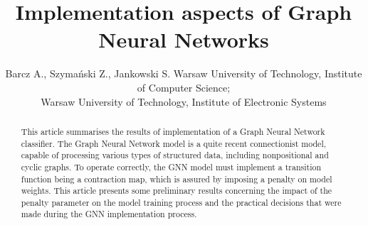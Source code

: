 \documentclass[]{spie}  %
\title{Implementation aspects of Graph Neural Networks}
\author{
Barcz A.\supit{a}, Szymański Z.\supit{a}, Jankowski S.\supit{b}
\skiplinehalf
\supit{a}Warsaw University of Technology, Institute of Computer Science;\\
\supit{b}Warsaw University of Technology, Institute of Electronic Systems
}
\begin{document}
 
\maketitle 

\begin{abstract}
This article summarises the results of implementation of a Graph Neural Network~\cite{scarselli2009graph} classifier. The Graph Neural Network model is a quite recent connectionist model, capable of processing various types of structured data, including nonpositional and cyclic graphs. To operate correctly, the GNN model must implement a transition function being a contraction map, which is assured by imposing a penalty on model weights. This article presents some preliminary results concerning the impact of the penalty parameter on the model training process and the practical decisions that were made during the GNN implementation process.
\end{abstract}



\end{document}
